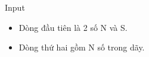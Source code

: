 Input  
\begin{itemize}
	\item     Dòng đầu tiên là 2 số N và S.   
	\item     Dòng thứ hai gồm N số trong dãy.   
\end{itemize}